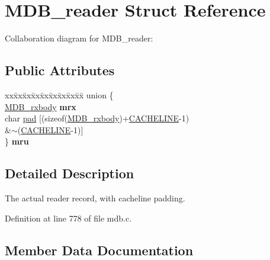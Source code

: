 \hypertarget{struct_m_d_b__reader}{}\section{M\+D\+B\+\_\+reader Struct Reference}
\label{struct_m_d_b__reader}


Collaboration diagram for M\+D\+B\+\_\+reader\+:
\subsection*{Public Attributes}
\begin{DoxyCompactItemize}
\item 
\mbox{\label{struct_m_d_b__reader_a94af7a242a87ca840e3230a0356cc663}} 
\begin{tabbing}
xx\=xx\=xx\=xx\=xx\=xx\=xx\=xx\=xx\=\kill
union \{\\
\>\mbox{\hyperlink{struct_m_d_b__rxbody}{MDB\_rxbody}} {\bfseries mrx}\\
\>char \mbox{\hyperlink{struct_m_d_b__reader_a63fb7cdc1c934e78b12cef0cc6ed5b01}{pad}} \mbox{[}(sizeof(\mbox{\hyperlink{struct_m_d_b__rxbody}{MDB\_rxbody}})+\mbox{\hyperlink{group__readers_gaa62717a1fae2c57f94f2a9b8ae08ec49}{CACHELINE}}-\/1) \\
\>\>\&$\sim$(\mbox{\hyperlink{group__readers_gaa62717a1fae2c57f94f2a9b8ae08ec49}{CACHELINE}}-\/1)\mbox{]}\\
\} {\bfseries mru}\\

\end{tabbing}\end{DoxyCompactItemize}


\subsection{Detailed Description}
The actual reader record, with cacheline padding. 

Definition at line 778 of file mdb.\+c.



\subsection{Member Data Documentation}
\mbox{\label{struct_m_d_b__reader_a63fb7cdc1c934e78b12cef0cc6ed5b01}} 
